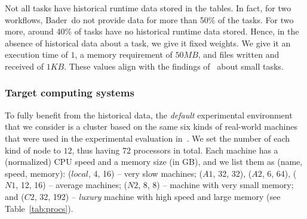 \documentclass[conference]{IEEEtran}
\newcommand{\skug}[1]{{\color{blue}[SK: #1]}}
\begin{document}
    Not all tasks have historical runtime data stored in the tables.
    In fact, for two workflows, Bader~\etal do not provide data for more than 50\% of the tasks.
    For two more, around 40\% of tasks have no historical runtime data stored.
    Hence, in the absence of historical data about a task, we give it fixed weights.
    We give it an execution time of $1$, a memory requirement of $50 MB$, and files written and received of $1KB$.
    These values align with the findings of~\cite{lotaru} about small tasks.
%

    \subsubsection{Target computing systems}

    To fully benefit from the historical data, the  {\em default} experimental environment
    that we consider is a cluster based on the same six
    kinds of real-world machines that were used in the experimental evaluation in~\cite{lotaru}.
    We set the number of each kind of node to $12$, thus having 72 processors in total.  %
%
    Each machine has a (normalized) CPU speed and a memory size (in GB), and we list them as (name, speed, memory):
    ($local$, 4, 16) -- very slow machines; ($A1$, 32, 32), ($A2$, 6, 64), ($N1$, 12, 16) -- average machines;
    ($N2$, 8, 8) -- machine with very small memory; and ($C2$, 32, 192) -- {\em luxury} machine with high speed and
    large memory (see Table~\ref{tab:procs}).
\end{document}
